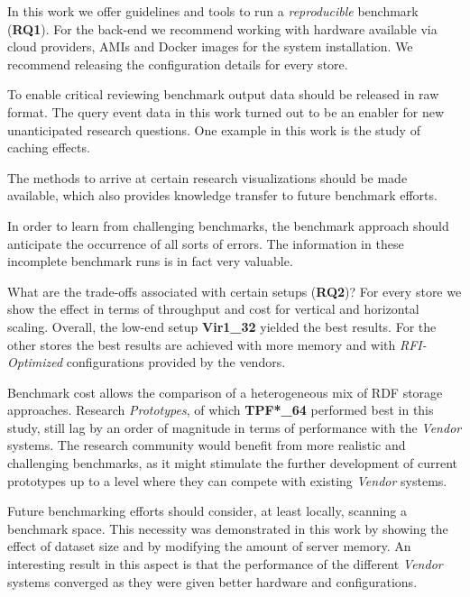 
In this work we offer guidelines and tools to run a \emph{reproducible} benchmark (\textbf{RQ1}). For the back-end we recommend working with hardware available via cloud providers, AMIs and Docker images for the system installation. We recommend releasing the configuration details for every store. 

To enable critical reviewing benchmark output data should be released in raw format. The  query event data in this work turned out to be an enabler for new unanticipated research questions. One example in this work is the study of caching effects. 

The methods to arrive at certain research visualizations should be made available, which also provides knowledge transfer to future benchmark efforts. 

In order to learn from challenging benchmarks, the benchmark approach should anticipate the occurrence of all sorts of errors. The information in these incomplete benchmark runs is in fact very valuable. 

What are the trade-offs associated with certain \mbox{setups} (\textbf{RQ2})? For every store we show the effect in terms of throughput and cost for vertical and horizontal scaling. 
Overall, the low-end setup \textbf{Vir1\_32} yielded the best results. For the other stores the best results are achieved with more memory and with \emph{RFI-Optimized} configurations provided by the vendors.

Benchmark cost allows the comparison of a heterogeneous mix of RDF storage approaches. Research \emph{Prototypes}, of which \textbf{TPF*\_64} performed best in this study, still lag by an order of magnitude in terms of performance with the \emph{Vendor} systems. The research community would benefit from more realistic and challenging benchmarks, as it might stimulate the further \mbox{development} of current prototypes up to a level where they can compete with existing \emph{Vendor} systems.

Future benchmarking efforts should consider, at least locally, scanning a benchmark space. This necessity was demonstrated in this work by showing the effect of dataset size and by modifying the amount of server memory. An interesting result in this aspect is that the performance of the different \emph{Vendor} systems converged as they were given better hardware and configurations.

